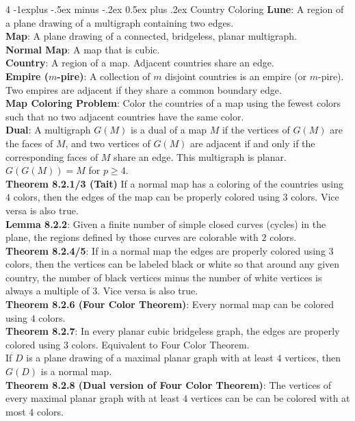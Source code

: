 \documentclass[letterpaper, 8pt]{extarticle}
\makeatletter
\renewcommand{\section}{\@startsection{section}{1}{0mm}%
	{-1explus -.5ex minus -.2ex}%
	{0.5ex plus .2ex}%
	{\normalfont\normalsize\bfseries}}
\makeatother
\begin{document}
\begin{multicols*}{4}
	\section{Country Coloring}
	\textbf{Lune}: A region of a plane drawing of a multigraph containing two edges. \\
	\textbf{Map}: A plane drawing of a connected, bridgeless, planar multigraph. \\
	\textbf{Normal Map}: A map that is cubic. \\
	\textbf{Country}: A region of a map. Adjacent countries share an edge. \\
	\textbf{Empire ($m$-pire)}: A collection of $m$ disjoint countries is an empire (or $m$-pire). Two empires are adjacent if they share a common boundary edge. \\
	\textbf{Map Coloring Problem}: Color the countries of a map using the fewest colors such that no two adjacent countries have the same color. \\
	\textbf{Dual}: A multigraph $G(M)$ is a dual of a map $M$ if the vertices of $G(M)$ are the faces of $M$, and two vertices of $G(M)$ are adjacent if and only if the corresponding faces of $M$ share an edge. This multigraph is planar. $G(G(M)) = M$ for $p \ge 4$. \\
	\textbf{Theorem 8.2.1/3 (Tait)} If a normal map has a coloring of the countries using $4$ colors, then the edges of the map can be properly colored using $3$ colors. Vice versa is also true. \\
	\textbf{Lemma 8.2.2}: Given a finite number of simple closed curves (cycles) in the plane, the regions defined by those curves are colorable with $2$ colors. \\
	\textbf{Theorem 8.2.4/5}: If in a normal map the edges are properly colored using $3$ colors, then the vertices can be labeled black or white so that around any given country, the number of black vertices minus the number of white vertices is always a multiple of $3$. Vice versa is also true. \\
	\textbf{Theorem 8.2.6 (Four Color Theorem)}: Every normal map can be colored using $4$ colors. \\
	\textbf{Theorem 8.2.7}: In every planar cubic bridgeless graph, the edges are properly colored using $3$ colors. Equivalent to Four Color Theorem. \\
	If $D$ is a plane drawing of a maximal planar graph with at least $4$ vertices, then $G(D)$ is a normal map. \\
	\textbf{Theorem 8.2.8 (Dual version of Four Color Theorem)}: The vertices of every maximal planar graph with at least $4$ vertices can be can be colored with at most $4$ colors. \\

\end{multicols*}
\end{document}
